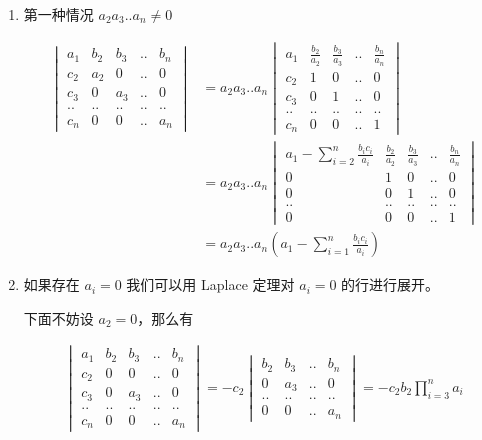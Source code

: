 \documentclass[12pt,a4paper]{ctexart}
\begin{document}
\begin{enumerate}
    \item 第一种情况 $a_2a_3..a_n \ne 0$

\begin{align*}
    \begin{vmatrix}
        a_1 & b_2 & b_3 & .. & b_n \\
        c_2 & a_2 & 0 & .. & 0 \\
        c_3 & 0 & a_3 & .. & 0 \\
        .. & .. & .. & .. & ..  \\
        c_n & 0 & 0 & .. & a_n 
    \end{vmatrix} &=   {a_2a_3..a_n}  \begin{vmatrix}
        a_1 & \frac{b_2}{a_2} & \frac{b_3}{a_3} & .. & \frac{b_n}{a_n} \\
        c_2 & 1 & 0 & .. & 0 \\
        c_3 & 0 & 1 & .. & 0 \\
        .. & .. & .. & .. & ..  \\
        c_n & 0 & 0 & .. & 1 
    \end{vmatrix} \\
    &= a_2a_3..a_n \begin{vmatrix}
        a_1 - \sum_{i=2}^{n}\frac{b_ic_i}{a_i} & \frac{b_2}{a_2} & \frac{b_3}{a_3} & .. & \frac{b_n}{a_n} \\
        0 & 1 & 0 & .. & 0 \\
        0 & 0 & 1 & .. & 0 \\
        .. & .. & .. & .. & ..  \\
        0 & 0 & 0 & .. & 1 
    \end{vmatrix} \\
    &= a_2a_3..a_n(a_1 - \sum_{i=1}^{n}\frac{b_ic_i}{a_i})
\end{align*}

    \item 如果存在 $a_i = 0$ 我们可以用 Laplace 定理对 $a_i = 0$ 的行进行展开。

    下面不妨设 $a_2 = 0$，那么有

    \begin{align*}
     \begin{vmatrix}
        a_1 & b_2 & b_3 & .. & b_n \\
        c_2 & 0 & 0 & .. & 0 \\
        c_3 & 0 & a_3 & .. & 0 \\
        .. & .. & .. & .. & ..  \\
        c_n & 0 & 0 & .. & a_n 
    \end{vmatrix}  =     -c_2     \begin{vmatrix}
        b_2 & b_3 & .. & b_n \\
        0 & a_3 & .. & 0 \\
        .. & .. & .. & ..  \\
        0 & 0 & .. & a_n 
    \end{vmatrix} = -c_2b_2 \prod_{i=3}^{n}a_i
    \end{align*}


\end{enumerate}
\end{document}
